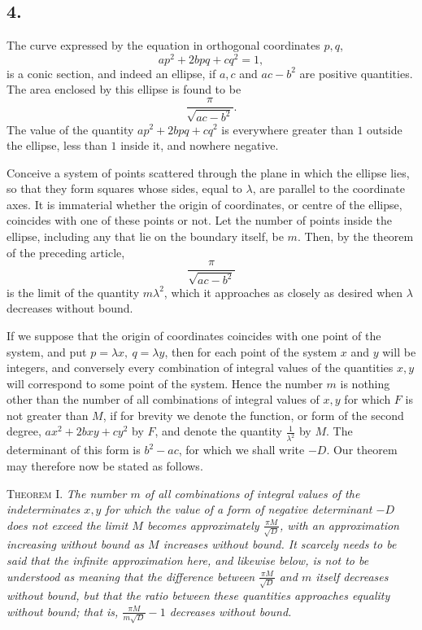 \documentclass[12pt]{article}
\begin{document}
\subsection*{4.}

The curve expressed by the equation in orthogonal coordinates $p,q$,
\[
ap^2+2bpq+cq^2=1,
\]
is a conic section, and indeed an ellipse, if $a,c$ and $ac-b^2$ are positive quantities. The area enclosed by this ellipse is found to be
\[
\frac{\pi}{\sqrt{ac-b^2}}.
\]
The value of the quantity $ap^2+2bpq+cq^2$ is everywhere greater than $1$ outside the ellipse, less than $1$ inside it, and nowhere negative.

Conceive a system of points scattered through the plane in which the ellipse lies, so that they form squares whose sides, equal to $\lambda$, are parallel to the coordinate axes. It is immaterial whether the origin of coordinates, or centre of the ellipse, coincides with one of these points or not. Let the number of points inside the ellipse, including any that lie on the boundary itself, be $m$. Then, by the theorem of the preceding article,
\[
\frac{\pi}{\sqrt{ac-b^2}}
\]
is the limit of the quantity $m\lambda^2$, which it approaches as closely as desired when $\lambda$ decreases without bound.

If we suppose that the origin of coordinates coincides with one point of the system, and put $p=\lambda x,\ q=\lambda y$, then for each point of the system $x$ and $y$ will be integers, and conversely every combination of integral values of the quantities $x,y$ will correspond to some point of the system. Hence the number $m$ is nothing other than the number of all combinations of integral values of $x,y$ for which $F$ is not greater than $M$, if for brevity we denote the function, or form of the second degree, $ax^2+2bxy+cy^2$ by $F$, and denote the quantity $\frac{1}{\lambda^2}$ by $M$. The determinant of this form is $b^2-ac$, for which we shall write $-D$. Our theorem may therefore now be stated as follows.

\textsc{Theorem I.} \emph{The number $m$ of all combinations of integral values of the indeterminates $x,y$ for which the value of a form of negative determinant $-D$ does not exceed the limit $M$ becomes approximately $\frac{\pi M}{\sqrt D}$, with an approximation increasing without bound as $M$ increases without bound. It scarcely needs to be said that the infinite approximation here, and likewise below, is not to be understood as meaning that the difference between $\frac{\pi M}{\sqrt D}$ and $m$ itself decreases without bound, but that the ratio between these quantities approaches equality without bound; that is, $\frac{\pi M}{m\sqrt D}-1$ decreases without bound.}
\end{document}
